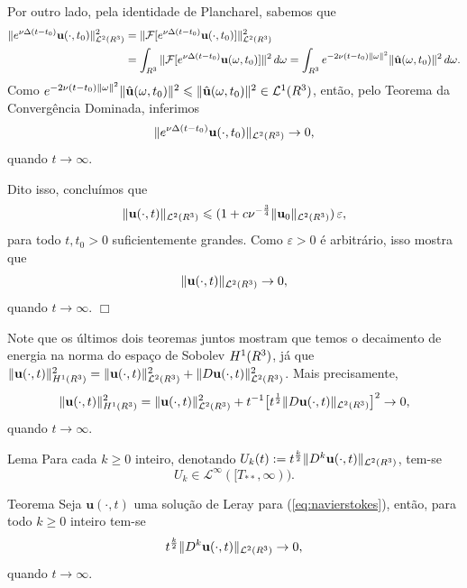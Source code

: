 \documentclass[xcolor=dvipsnames, aspectratio=169, 10pt]{beamer}
\let\mathbb\relax
\newcommand{\bR}{\mathbb{R}}
\newcommand{\bu}{\mathbf{u}}
\newcommand{\cF}{\mathcal{F}}
\newcommand{\cL}{\mathcal{L}}
\begin{document}
\begin{frame}
    Por outro lado, pela identidade de Plancharel, sabemos que
    \[
        \begin{aligned}
            \Vert e^{\nu \Delta (t-t_0)} \bu(\cdot,t_0) \Vert_{\cL^2(\bR^3)}^2 &= \Vert \cF [ e^{\nu \Delta (t-t_0) }\bu(\cdot,t_0)] \Vert_{\cL^2(\bR^3)}^2\\ &= \int_{\bR^3} \Vert \cF[ e^{\nu \Delta (t-t_0)} \bu(\omega,t_0)]\Vert^2 \,d\omega = \int_{\bR^3} e^{-2\nu (t-t_0) \Vert \omega \Vert^2} \Vert \hat{\bu} (\omega,t_0) \Vert^2 \,d\omega.
        \end{aligned}
    \]
    Como $e^{-2\nu (t-t_0) \Vert \omega \Vert^2} \Vert \hat{\bu}(\omega,t_0) \Vert^2 \leqslant \Vert \hat{\bu}(\omega,t_0) \Vert^2 \in \cL^1(\bR^3)$, então, pelo Teorema da Convergência Dominada, inferimos
    \[
        \Vert e^{\nu \Delta (t-t_0)} \bu(\cdot,t_0) \Vert_{\cL^2(\bR^3)} \to 0,
    \]
    quando $t \to \infty$.
\end{frame}
\begin{frame}
    Dito isso, concluímos que
    \[
        \Vert \bu(\cdot,t) \Vert_{\cL^2(\bR^3)} \leqslant (1 + c \nu^{-\frac{3}{4}} \Vert \bu_0 \Vert_{\cL^2(\bR^3)}) \,\varepsilon,
    \]
    para todo $t,t_0 > 0$ suficientemente grandes.
    Como $\varepsilon > 0$ é arbitrário, isso mostra que
    \[
        \Vert \bu(\cdot,t) \Vert_{\cL^2(\bR^3)} \to 0,
    \]
    quando $t \to \infty$. \hfill $\Box$
\end{frame}
\begin{frame}
    Note que os últimos dois teoremas juntos mostram que temos o decaimento de energia na norma do espaço de Sobolev $H^1(\bR^3)$, já que $\Vert \bu(\cdot,t) \Vert_{H^1(\bR^3)}^2 = \Vert \bu(\cdot,t) \Vert_{\cL^2(\bR^3)}^2 + \Vert D\bu(\cdot,t) \Vert_{\cL^2(\bR^3)}^2$. Mais precisamente,
\[
    \Vert \bu(\cdot,t) \Vert_{H^1(\bR^3)}^2 = \Vert \bu(\cdot,t) \Vert_{\cL^2(\bR^3)}^2 + t^{-1} \big[ t^{\frac{1}{2}} \Vert D\bu(\cdot,t) \Vert_{\cL^2(\bR^3)}\big]^2 \to 0,
\]
quando $t \to \infty$.
\end{frame}
\begin{frame}
    \begin{block}{Lema}
        Para cada $k \geqslant 0$ inteiro, denotando $U_k(t) := t^{\frac{k}{2}} \Vert D^k \bu(\cdot,t) \Vert_{\cL^2(\bR^3)}$, tem-se
    \[
        U_k \in \cL^\infty([T_{**}, \infty)).
    \]
    \end{block}

    \begin{block}{Teorema}
        Seja $\bu(\cdot,t)$ uma solução de Leray para (\ref{eq:navierstokes}), então, para todo $k \geqslant 0$ inteiro tem-se
    \[
        t^{\frac{k}{2}} \Vert D^k\bu(\cdot,t) \Vert_{\cL^2(\bR^3)} \to 0,
    \]
    quando $t \to \infty$.
    \end{block}
\end{frame}
\end{document}
